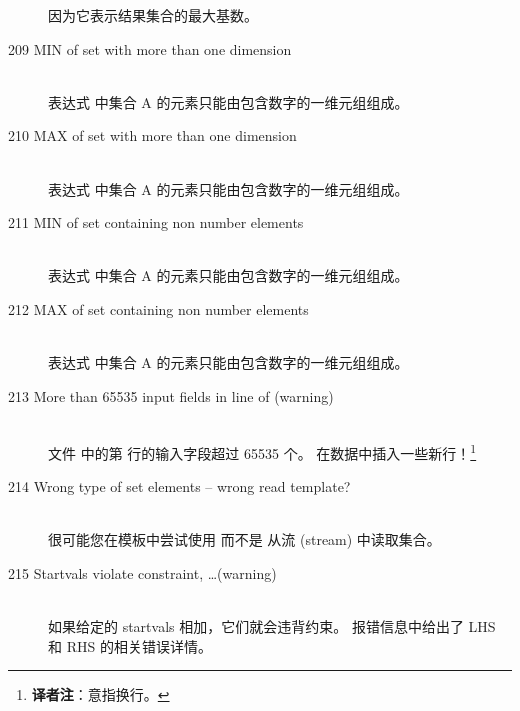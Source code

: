 \begin{description}
  因为它表示结果集合的最大基数。
\item[209 MIN of set with more than one dimension]\ \\
  表达式  中集合 A 的元素只能由包含数字的一维元组组成。
\item[210 MAX of set with more than one dimension]\ \\
  表达式  中集合 A 的元素只能由包含数字的一维元组组成。
\item[211 MIN of set containing non number elements]\ \\
  表达式  中集合 A 的元素只能由包含数字的一维元组组成。
\item[212 MAX of set containing non number elements]\ \\
  表达式  中集合 A 的元素只能由包含数字的一维元组组成。  
\item[213 More than 65535 input fields in line \code{xxx} of
   \code{yyy} (warning)]\ \\
  文件  中的第  行的输入字段超过 65535 个。
  在数据中插入一些新行！\footnote{\textbf{译者注}：意指换行。}
\item[214 Wrong type of set elements -- wrong read template?]\ \\
  很可能您在模板中尝试使用  而不是  
  从流 (stream) 中读取集合。
\item[215 Startvals violate constraint, \ldots (warning)]\ \\
  如果给定的 startvals 相加，它们就会违背约束。
  报错信息中给出了 LHS 和 RHS 的相关错误详情。

\end{description}
